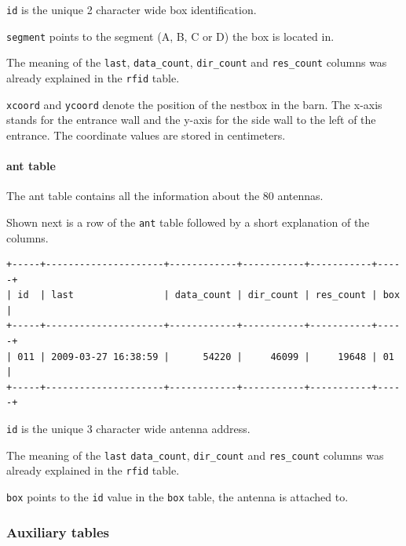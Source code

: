 \begin{mydesc}
\item \lstinline|id| is the unique 2 character wide box identification.
\item \lstinline|segment| points to the segment (A, B, C or D) the box is located in.
\item The meaning of the \lstinline|last|, \lstinline|data_count|, \lstinline|dir_count| and \lstinline|res_count| columns was already explained in the \lstinline|rfid| table.
\item \lstinline|xcoord| and \lstinline|ycoord| denote the position of the nestbox in the barn. The x-axis stands for the entrance wall and the y-axis for  the side wall to the left of the entrance. The coordinate values are stored in centimeters. 
\end{mydesc}

\paragraph{ant table} 
\label{para:ant_table}

The ant table contains all the information about the 80 antennas. 

Shown next is a row of the \lstinline|ant| table followed by a short explanation of the columns.
\codescript
{}
\begin{lstlisting}[frame=none]
+-----+---------------------+------------+-----------+-----------+-----+
| id  | last                | data_count | dir_count | res_count | box |
+-----+---------------------+------------+-----------+-----------+-----+
| 011 | 2009-03-27 16:38:59 |      54220 |     46099 |     19648 | 01  | 
+-----+---------------------+------------+-----------+-----------+-----+

\end{lstlisting}

\begin{mydesc}
\item \lstinline|id| is the unique 3 character wide antenna address.
\item The meaning of the \lstinline|last| \lstinline|data_count|, \lstinline|dir_count| and \lstinline|res_count| columns was already explained in the \lstinline|rfid| table.
\item \lstinline|box| points to the \lstinline|id| value in the \lstinline|box| table, the antenna is attached to.
\end{mydesc}

\subsubsection{Auxiliary tables}
\label{subsubsec:auxiliary_tables}

